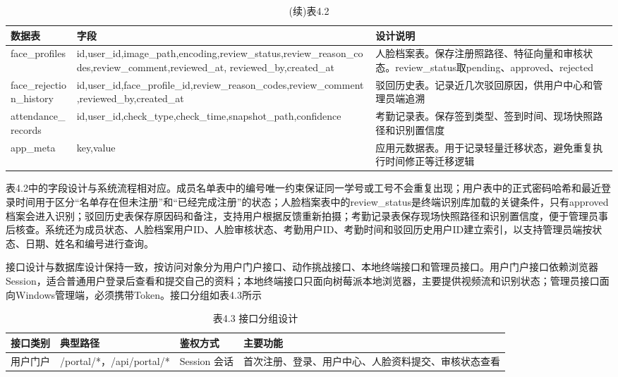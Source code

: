 \documentclass[UTF8]{heuthesis}
\begin{document}
\begingroup
\small
\begin{longtable}{|>{\raggedright\arraybackslash}p{}|>{\raggedright\arraybackslash}p{}|>{\raggedright\arraybackslash}p{}|}
\caption{(续)表4.2}\\
\hline
数据表 & 字段 & 设计说明 \\
\hline
face\_profiles & id,user\_id,image\_path,encoding,review\_status,review\_reason\_codes,review\_comment,reviewed\_at, reviewed\_by,created\_at & 人脸档案表。保存注册照路径、特征向量和审核状态。review\_status取pending、approved、rejected \\
\hline
face\_rejection\_history & id,user\_id,face\_profile\_id,review\_reason\_codes,review\_comment,reviewed\_by,created\_at & 驳回历史表。记录近几次驳回原因，供用户中心和管理员端追溯 \\
\hline
attendance\_records & id,user\_id,check\_type,check\_time,snapshot\_path,confidence & 考勤记录表。保存签到类型、签到时间、现场快照路径和识别置信度 \\
\hline
app\_meta & key,value & 应用元数据表。用于记录轻量迁移状态，避免重复执行时间修正等迁移逻辑 \\
\hline
\end{longtable}
\endgroup

表4.2中的字段设计与系统流程相对应。成员名单表中的编号唯一约束保证同一学号或工号不会重复出现；用户表中的正式密码哈希和最近登录时间用于区分“名单存在但未注册”和“已经完成注册”的状态；人脸档案表中的review\_status是终端识别库加载的关键条件，只有approved档案会进入识别；驳回历史表保存原因码和备注，支持用户根据反馈重新拍摄；考勤记录表保存现场快照路径和识别置信度，便于管理员事后核查。系统还为成员状态、人脸档案用户ID、人脸审核状态、考勤用户ID、考勤时间和驳回历史用户ID建立索引，以支持管理员端按状态、日期、姓名和编号进行查询。

接口设计与数据库设计保持一致，按访问对象分为用户门户接口、动作挑战接口、本地终端接口和管理员接口。用户门户接口依赖浏览器Session，适合普通用户登录后查看和提交自己的资料；本地终端接口只面向树莓派本地浏览器，主要提供视频流和识别状态；管理员接口面向Windows管理端，必须携带Token。接口分组如表4.3所示

\begingroup
\small
\begin{longtable}{|>{\raggedright\arraybackslash}p{}|>{\raggedright\arraybackslash}p{}|>{\raggedright\arraybackslash}p{}|>{\raggedright\arraybackslash}p{}|}
\caption{表4.3 接口分组设计}\\
\hline
接口类别 & 典型路径 & 鉴权方式 & 主要功能 \\
\hline
用户门户 & /portal/*，/api/portal/* & Session 会话 & 首次注册、登录、用户中心、人脸资料提交、审核状态查看 \\
\hline
\end{longtable}
\endgroup
\end{document}
